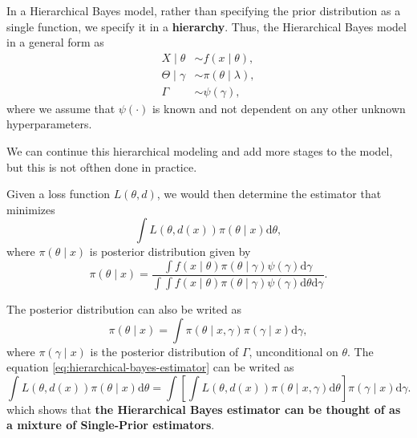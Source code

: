 In a Hierarchical Bayes model, rather than specifying the prior distribution as a single function, we specify it in a \textbf{hierarchy}. Thus, the Hierarchical Bayes model in a general form as
\begin{equation}
	\begin{aligned}
		X\mid\theta      & \sim f\left(x\mid\theta\right),         \\
		\Theta\mid\gamma & \sim \pi\left(\theta\mid\lambda\right), \\
		\Gamma           & \sim \psi\left(\gamma\right),
	\end{aligned}
	\label{eq:hierarchical-bayes}
\end{equation}
where we assume that $\psi\left(\cdot\right)$ is known and not dependent on any other unknown hyperparameters.

\begin{remark}
	We can continue this hierarchical modeling and add more stages to the model, but this is not ofthen done in practice.
\end{remark}

Given a loss function $L\left(\theta,d\right)$, we would then determine the estimator that minimizes
\begin{equation} \label{eq:hierarchical-bayes-estimator}
	\int L\left(\theta,d\left(x\right)\right)\pi\left(\theta\mid x\right)\mathrm{d}\theta,
\end{equation}
where $\pi\left(\theta\mid x\right)$ is posterior distribution given by
\begin{equation*}
	\pi\left(\theta\mid x\right)=\frac{\int f\left(x\mid\theta\right)\pi\left(\theta\mid\gamma\right)\psi\left(\gamma\right)\mathrm{d}\gamma}{\int\int f\left(x\mid\theta\right)\pi\left(\theta\mid\gamma\right)\psi\left(\gamma\right)\mathrm{d}\theta\mathrm{d}\gamma}.
\end{equation*}

\begin{remark}
	The posterior distribution can also be writed as
	\begin{equation*}
		\pi\left(\theta\mid x\right)=\int\pi\left(\theta\mid x,\gamma\right)\pi\left(\gamma\mid x\right)\mathrm{d}\gamma,
	\end{equation*}
	where $\pi\left(\gamma\mid x\right)$ is the posterior distribution of $\Gamma$, unconditional on $\theta$. The equation \ref{eq:hierarchical-bayes-estimator} can be writed as
	\begin{equation*}
		\int L\left(\theta,d\left(x\right)\right)\pi\left(\theta\mid x\right)\mathrm{d}\theta = \int\left[\int L\left(\theta,d\left(x\right)\right)\pi\left(\theta\mid x,\gamma\right)\mathrm{d}\theta\right]\pi\left(\gamma\mid x\right)\mathrm{d}\gamma.
	\end{equation*}
	which shows that \textbf{the Hierarchical Bayes estimator can be thought of as a mixture of Single-Prior estimators}.
\end{remark}


